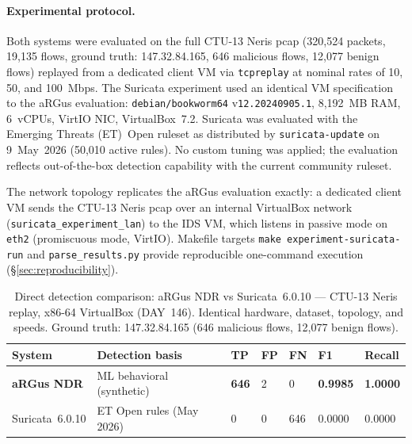 \documentclass[11pt,a4paper]{article}
\begin{document}
    \paragraph{Experimental protocol.}
    Both systems were evaluated on the full CTU-13 Neris pcap (320,524 packets, 19,135 flows,
    ground truth: 147.32.84.165, 646 malicious flows, 12,077 benign flows) replayed from a
    dedicated client VM via \texttt{tcpreplay} at nominal rates of 10, 50, and 100~Mbps.
    The Suricata experiment used an identical VM specification to the aRGus evaluation:
    \texttt{debian/bookworm64} v\texttt{12.20240905.1}, 8,192~MB RAM, 6~vCPUs, VirtIO NIC,
    VirtualBox~7.2. Suricata was evaluated with the Emerging Threats (ET)~Open ruleset as
    distributed by \texttt{suricata-update} on 9~May~2026 (50,010 active rules). No custom
    tuning was applied; the evaluation reflects out-of-the-box detection capability with the
    current community ruleset.

    The network topology replicates the aRGus evaluation exactly: a dedicated client VM sends
    the CTU-13 Neris pcap over an internal VirtualBox network (\texttt{suricata\_experiment\_lan})
    to the IDS VM, which listens in passive mode on \texttt{eth2} (promiscuous mode, VirtIO).
    Makefile targets \texttt{make experiment-suricata-run} and \texttt{parse\_results.py} provide
    reproducible one-command execution (\S\ref{sec:reproducibility}).

    \begin{table}[h]
        \centering
        \caption{Direct detection comparison: aRGus NDR vs Suricata~6.0.10 ---
        CTU-13 Neris replay, x86-64 VirtualBox (DAY~146).
        Identical hardware, dataset, topology, and speeds.
        Ground truth: 147.32.84.165 (646 malicious flows, 12,077 benign flows).}
        \label{tab:suricata_comparison}
        \begin{tabular}{lllllll}
            \toprule
            \textbf{System} & \textbf{Detection basis} & \textbf{TP} & \textbf{FP} & \textbf{FN} & \textbf{F1} & \textbf{Recall} \\
            \midrule
            \textbf{aRGus NDR}   & ML behavioral (synthetic) & \textbf{646} & 2 & 0   & \textbf{0.9985} & \textbf{1.0000} \\
            Suricata~6.0.10      & ET Open rules (May 2026)  & 0            & 0 & 646 & 0.0000          & 0.0000          \\
            \bottomrule
        \end{tabular}
    \end{table}
\end{document}
